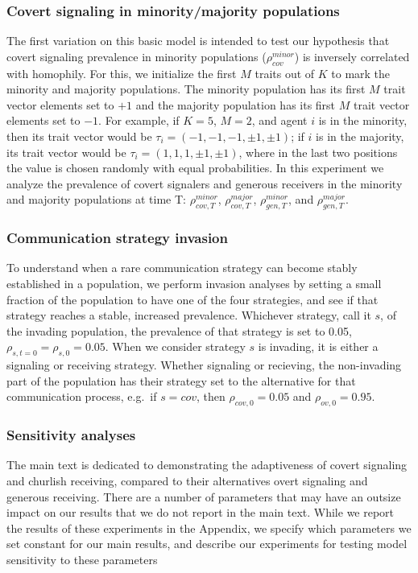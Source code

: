 \documentclass[11pt,letterpaper]{article}
\begin{document}
\subsubsection{Covert signaling in minority/majority populations}
The first variation on this basic model is intended to test our 
hypothesis that covert signaling prevalence in 
minority populations ($\rho_{cov}^{minor}$) is inversely correlated with
homophily. For this, we initialize the first $M$ traits out of $K$ to mark the 
minority and majority populations. The minority population has its first
$M$ trait vector elements set to $+1$ and the majority population has its
first $M$ trait vector elements set to $-1$. For example, if $K=5$, $M=2$,
and agent $i$ is in the minority, then its trait vector would be
$\tau_i = (-1, -1, -1, \pm 1, \pm 1)$; if $i$ is in the majority, its 
trait vector would be $\tau_i = (1, 1, 1, \pm 1, \pm 1)$, where in the last
two positions the value is chosen randomly with equal probabilities.
In this experiment we analyze the prevalence of covert signalers and 
generous receivers in the minority and majority populations at time T: 
$\rho_{cov,T}^{minor}$, $\rho_{cov,T}^{major}$,
$\rho_{gen,T}^{minor}$, and $\rho_{gen,T}^{major}$.

\subsubsection{Communication strategy invasion}

To understand when a rare communication strategy can become stably established
in a population, we perform invasion analyses by setting a small fraction of
the population to have one of the four strategies, and see if that strategy
reaches a stable, increased prevalence. Whichever strategy, call it $s$,  of the invading
population, the prevalence of that strategy is set to 0.05, $\rho_{s,t=0}=\rho_{s,0}=0.05$.
When we consider strategy $s$ is invading, it is either a signaling or receiving strategy. 
Whether signaling or recieving, the non-invading part of the population has
their strategy set to the alternative for that communication process, e.g.\
if $s=cov$, then $\rho_{cov,0}=0.05$ and $\rho_{ov,0}=0.95$.

\subsubsection{Sensitivity analyses}

The main text is dedicated to demonstrating the adaptiveness of covert signaling
and churlish receiving, compared to their alternatives overt signaling and
generous receiving. There are a number of parameters that may have an outsize impact on our results
that we do not report in the main text. While we report the results of these
experiments in the Appendix, we specify which parameters we set constant for
our main results, and describe our experiments for testing model sensitivity
to these parameters
\end{document}
